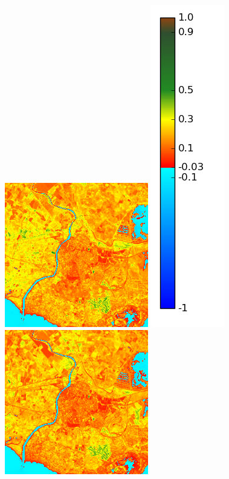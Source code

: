 \documentclass{book}
\begin{document}
\begin{figure}[H]
{\includegraphics[scale=0.4]{images/Agde/09_ndvi.png}
\includegraphics[scale=0.2]{images/colormap.png}
\includegraphics[scale=0.4]{images/Agde/10_ndvi.png}
}
\end{figure}
\end{document}
